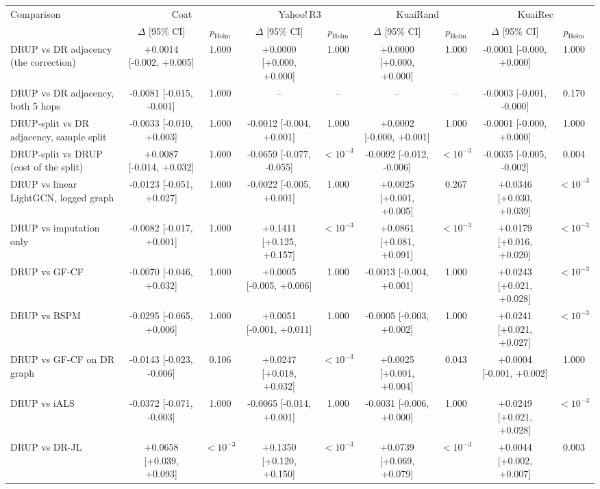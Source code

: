 \begin{tabular}{lcccccccc}
\toprule
Comparison & \multicolumn{2}{c}{Coat} & \multicolumn{2}{c}{Yahoo!\,R3} & \multicolumn{2}{c}{KuaiRand} & \multicolumn{2}{c}{KuaiRec}\\
 & $\Delta$ [95\% CI] & $p_{\mathrm{Holm}}$ & $\Delta$ [95\% CI] & $p_{\mathrm{Holm}}$ & $\Delta$ [95\% CI] & $p_{\mathrm{Holm}}$ & $\Delta$ [95\% CI] & $p_{\mathrm{Holm}}$\\
\midrule
DRUP vs DR adjacency (the correction) & +0.0014 [-0.002, +0.005] & 1.000 & +0.0000 [+0.000, +0.000] & 1.000 & +0.0000 [+0.000, +0.000] & 1.000 & -0.0001 [-0.000, +0.000] & 1.000\\
DRUP vs DR adjacency, both 5 hops & -0.0081 [-0.015, -0.001] & 1.000 & -- & -- & -- & -- & -0.0003 [-0.001, -0.000] & 0.170\\
DRUP-split vs DR adjacency, sample split & -0.0033 [-0.010, +0.003] & 1.000 & -0.0012 [-0.004, +0.001] & 1.000 & +0.0002 [-0.000, +0.001] & 1.000 & -0.0001 [-0.000, +0.000] & 1.000\\
DRUP-split vs DRUP (cost of the split) & +0.0087 [-0.014, +0.032] & 1.000 & -0.0659 [-0.077, -0.055] & $<10^{-3}$ & -0.0092 [-0.012, -0.006] & $<10^{-3}$ & -0.0035 [-0.005, -0.002] & 0.004\\
DRUP vs linear LightGCN, logged graph & -0.0123 [-0.051, +0.027] & 1.000 & -0.0022 [-0.005, +0.001] & 1.000 & +0.0025 [+0.001, +0.005] & 0.267 & +0.0346 [+0.030, +0.039] & $<10^{-3}$\\
DRUP vs imputation only & -0.0082 [-0.017, +0.001] & 1.000 & +0.1411 [+0.125, +0.157] & $<10^{-3}$ & +0.0861 [+0.081, +0.091] & $<10^{-3}$ & +0.0179 [+0.016, +0.020] & $<10^{-3}$\\
DRUP vs GF-CF & -0.0070 [-0.046, +0.032] & 1.000 & +0.0005 [-0.005, +0.006] & 1.000 & -0.0013 [-0.004, +0.001] & 1.000 & +0.0243 [+0.021, +0.028] & $<10^{-3}$\\
DRUP vs BSPM & -0.0295 [-0.065, +0.006] & 1.000 & +0.0051 [-0.001, +0.011] & 1.000 & -0.0005 [-0.003, +0.002] & 1.000 & +0.0241 [+0.021, +0.027] & $<10^{-3}$\\
DRUP vs GF-CF on DR graph & -0.0143 [-0.023, -0.006] & 0.106 & +0.0247 [+0.018, +0.032] & $<10^{-3}$ & +0.0025 [+0.001, +0.004] & 0.043 & +0.0004 [-0.001, +0.002] & 1.000\\
DRUP vs iALS & -0.0372 [-0.071, -0.003] & 1.000 & -0.0065 [-0.014, +0.001] & 1.000 & -0.0031 [-0.006, +0.000] & 1.000 & +0.0249 [+0.021, +0.028] & $<10^{-3}$\\
DRUP vs DR-JL & +0.0658 [+0.039, +0.093] & $<10^{-3}$ & +0.1350 [+0.120, +0.150] & $<10^{-3}$ & +0.0739 [+0.069, +0.079] & $<10^{-3}$ & +0.0044 [+0.002, +0.007] & 0.003\\

\end{tabular}
